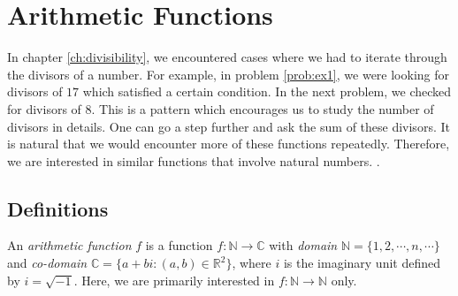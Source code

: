 \documentclass[12pt]{subfile}
\begin{document}
\chapter{Arithmetic Functions}\label{ch:arithfunc}

	In chapter \ref{ch:divisibility}, we encountered cases where we had to iterate through the divisors of a number. For example, in problem \ref{prob:ex1}, we were looking for divisors of $17$ which satisfied a certain condition. In the next problem, we checked for divisors of $8$. This is a pattern which encourages us to study the number of divisors in details. One can go a step further and ask the sum of these divisors. It is natural that we would encounter more of these functions repeatedly. Therefore, we are interested in similar functions that involve natural numbers. \watermark.
\section{Definitions}

		\begin{definition}
			An \textit{arithmetic function} $f$ is a function $f : \mathbb{N} \to \mathbb{C} $ with \textit{domain} $\mathbb{N} = \{1, 2, \cdots, n, \cdots\}$ and \textit{co-domain} $\mathbb{C} = \{a+bi: (a,b)\in \mathbb{R}^2 \}$, where $i$ is the imaginary unit defined by $i=\sqrt{-1}$. Here, we are primarily interested in $f:\mathbb{N}\to\mathbb{N}$ only.
		\end{definition}
\end{document}
